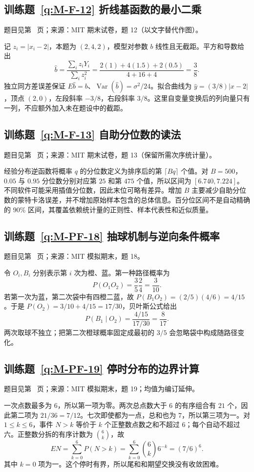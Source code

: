 \subsection*{训练题~\ref{q:M-F-12} 折线基函数的最小二乘}\label{a:M-F-12}{\small 题目见第~\pageref{q:M-F-12} 页；来源：MIT 期末试卷，题 12（以文字替代作图）。}
\begin{solve}记 $z_i=|x_i-2|$，本题为 $(2,4,2)$，模型对参数 $b$ 线性且无截距。平方和导数给出\[\widehat b=\frac{\sum_i z_iY_i}{\sum_i z_i^2}=\frac{2(1)+4(1.5)+2(0.5)}{4+16+4}=\frac38.\]独立同方差误差保证 $E\widehat b=b$、$\operatorname{Var}(\widehat b)=\sigma^2/24$。拟合曲线为 $\widehat y=(3/8)|x-2|$，顶点 $(2,0)$，左段斜率 $-3/8$，右段斜率 $3/8$。这里自变量变换后的列向量只有一列，不应额外加入未在题设中的截距。\end{solve}

\subsection*{训练题~\ref{q:M-F-13} 自助分位数的读法}\label{a:M-F-13}{\small 题目见第~\pageref{q:M-F-13} 页；来源：MIT 期末试卷，题 13（保留所需次序统计量）。}
\begin{solve}经验分布逆函数将概率 $q$ 的分位数定义为排序后的第 $\lceil Bq\rceil$ 个值。对 $B=500$，$0.05$ 与 $0.95$ 分位数分别对应第 $25$ 和第 $475$ 个值，所以区间为 $[6.740,7.224]$。不同软件可能采用插值分位数，因此末位可略有差异。增加 $B$ 主要减少自助分位数的蒙特卡洛误差，并不增加原始样本包含的总体信息。百分位区间不是自动精确的 $90\%$ 区间，其覆盖依赖统计量的正则性、样本代表性和近似质量。\end{solve}

\subsection*{训练题~\ref{q:M-PF-18} 抽球机制与逆向条件概率}\label{a:M-PF-18}{\small 题目见第~\pageref{q:M-PF-18} 页；来源：MIT 模拟期末，题 18。}
\begin{solve}令 $O_i,B_i$ 分别表示第 $i$ 次为橙、蓝。第一种路径概率为\[P(O_1O_2)=\frac35\frac24=\frac3{10}.\]若第一次为蓝，第二次袋中有四橙二蓝，故 $P(B_1O_2)=(2/5)(4/6)=4/15$。于是 $P(O_2)=3/10+4/15=17/30$，贝叶斯公式给出\[P(B_1\mid O_2)=\frac{4/15}{17/30}=\frac8{17}.\]两次取球不独立；把第二次橙球概率固定成最初的 $3/5$ 会忽略袋中构成随路径变化。\end{solve}

\subsection*{训练题~\ref{q:M-PF-19} 停时分布的边界计算}\label{a:M-PF-19}{\small 题目见第~\pageref{q:M-PF-19} 页；来源：MIT 模拟期末，题 19；均值为编订延伸。}
\begin{solve}一次点数最多为 $6$，所以第一项为零。两次总点数大于 $6$ 的有序组合有 $21$ 个，因此第二项为 $21/36=7/12$。七次即使都为一点，总和也为 $7$，所以第三项为一。对 $1\le k\le6$，事件 $N>k$ 等价于 $k$ 个正整数点数之和不超过 $6$；每个自动不超过六。正整数分拆的有序计数为 $\binom6k$，故\[EN=\sum_{k=0}^6P(N>k)=\sum_{k=0}^6\binom6k6^{-k}=(7/6)^6.\]其中 $k=0$ 项为一。这个停时有界，所以尾和和期望交换没有收敛困难。\end{solve}


